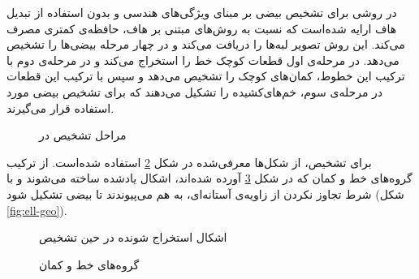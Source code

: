 \documentclass[12pt,a4paper]{article}
\numberwithin{equation}{section}
\numberwithin{figure}{section}
\theoremstyle{definition}
\theoremstyle{theorem}
\theoremstyle{definition}
\begin{document}
در \cite{geo} روشی برای تشخیص بیضی بر مبنای ویژگی‌های هندسی و بدون استفاده از تبدیل هاف ارایه شده‌است که نسبت به روش‌های مبتنی بر هاف، حافظه‌ی کمتری مصرف می‌کند. این روش تصویر لبه‌ها را دریافت می‌کند و در چهار مرحله بیضی‌ها را تشخیص می‌دهد. در مرحله‌ی اول قطعات کوچک خط را استخراج می‌کند و در مرحله‌ی دوم با ترکیب این خطوط، کمان‌های کوچک را تشخیص می‌دهد و سپس با ترکیب این قطعات در مرحله‌ی سوم، خم‌های‌کشیده را تشکیل می‌دهند که برای تشخیص بیضی مورد استفاده قرار می‌گیرند. 

\begin{figure}[h]
\centering
{}
\caption{مراحل تشخیص در \cite{geo}}
\label{fig:4stage}
\end{figure}
برای تشخیص، از شکل‌ها معرفی‌شده در شکل \ref{fig:segs} استفاده شده‌است. از ترکیب گروه‌های خط و کمان که در شکل \ref{fig:groups} آورده شده‌اند، اشکال یادشده ساخته می‌شوند و با شرط تجاوز نکردن از زاویه‌ی آستانه‌ای، به هم می‌پیوندند تا بیضی تشکیل شود (شکل \ref{fig:ell-geo}). 

\begin{figure}[h]
\centering
{}
\caption{اشکال استخراج شونده در حین تشخیص \cite{geo}}
\label{fig:segs}
\end{figure}

\newpage 

\begin{figure}[h]
\centering
{}
\caption{گروه‌های خط و کمان \cite{geo}}
\label{fig:groups}
\end{figure}
\end{document}
